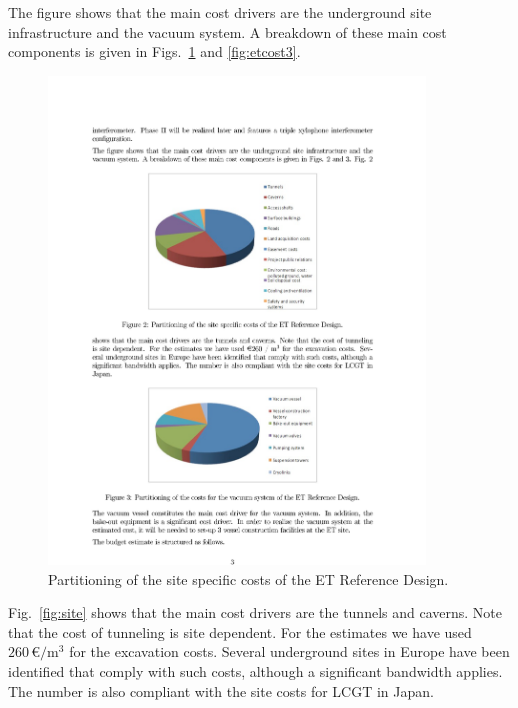 The figure shows that the main cost drivers are the underground site infrastructure
and the vacuum system. A breakdown of these main cost components is given
in Figs.~\ref{fig:etcost2} and \ref{fig:etcost3}.
\begin{figure}[htbp!]
	\begin{center}
		\includegraphics[width=10cm]{./Sec_SiteInfra/Figures/ETcost2.pdf}
		\caption{Partitioning of the site specific costs of the ET Reference Design.}
		\label{fig:etcost2}
	\end{center}
\end{figure}
Fig.~\ref{fig:site} shows that the main cost drivers are the tunnels and caverns.
Note that the cost of tunneling is site dependent. For the estimates we have
used $260\,\euro / \mathrm{m^3}$ for the excavation costs. Several underground sites in Europe
have been identified that comply with such costs, although a significant
bandwidth applies. The number is also compliant with the site costs for
LCGT in Japan.


